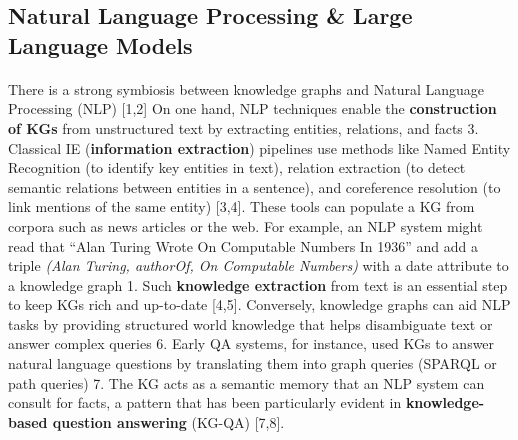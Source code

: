     \newpage
    \subsection{Natural Language Processing \& Large Language Models}

        \paragraph{}
        There is a strong symbiosis between knowledge graphs and Natural Language Processing (NLP) [1,2] On one hand, NLP techniques enable the \textbf{construction of KGs} from unstructured text by extracting entities, relations, and facts 3. Classical IE (\textbf{information extraction}) pipelines use methods like Named Entity Recognition (to identify key entities in text), relation extraction (to detect semantic relations between entities in a sentence), and coreference resolution (to link mentions of the same entity) [3,4]. These tools can populate a KG from corpora such as news articles or the web. For example, an NLP system might read that “Alan Turing Wrote On Computable Numbers In 1936” and add a triple \textit{(Alan Turing, authorOf, On Computable Numbers)} with a date attribute to a knowledge graph 1. Such \textbf{knowledge extraction} from text is an essential step to keep KGs rich and up-to-date [4,5]. Conversely, knowledge graphs can aid NLP tasks by providing structured world knowledge that helps disambiguate text or answer complex queries 6. Early QA systems, for instance, used KGs to answer natural language questions by translating them into graph queries (SPARQL or path queries) 7. The KG acts as a semantic memory that an NLP system can consult for facts, a pattern that has been particularly evident in \textbf{knowledge-based question answering} (KG-QA) [7,8].
